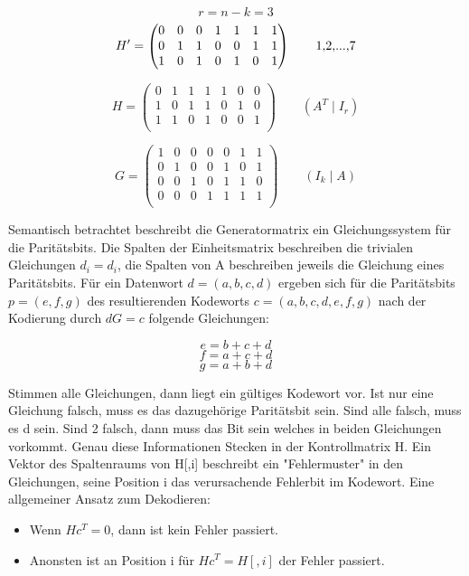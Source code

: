 $$r = n-k = 3$$
$$H' = \begin{pmatrix}
0 & 0 & 0 & 1 & 1 & 1 & 1 \\
0 & 1 & 1 & 0 & 0 & 1 & 1 \\
1 & 0 & 1 & 0 & 1 & 0 & 1 \\
\end{pmatrix}\text{\qquad{1,2,...,7}}$$

$$H = \begin{pmatrix}
0 & 1 & 1 & 1 & 1 & 0 & 0 \\
1 & 0 & 1 & 1 & 0 & 1 & 0 \\
1 & 1 & 0 & 1 & 0 & 0 & 1 \\
\end{pmatrix}\qquad{(A^T \mid I_r)}$$

$$G = \begin{pmatrix}
1 & 0 & 0 & 0 & 0 & 1 & 1 \\
0 & 1 & 0 & 0 & 1 & 0 & 1 \\
0 & 0 & 1 & 0 & 1 & 1 & 0 \\
0 & 0 & 0 & 1 & 1 & 1 & 1 \\
\end{pmatrix}\qquad{(I_k \mid A)}$$

Semantisch betrachtet beschreibt die Generatormatrix ein Gleichungssystem für die Paritätsbits. Die Spalten der Einheitsmatrix beschreiben die trivialen Gleichungen $d_i = d_i$, die Spalten von A beschreiben jeweils die Gleichung eines Paritätsbits. Für ein Datenwort $d=(a,b,c,d)$ ergeben sich für die Paritätsbits $p=(e,f,g)$ des resultierenden Kodeworts $c=(a,b,c,d,e,f,g)$ nach der Kodierung durch $dG = c$ folgende Gleichungen:

$$ e = b+c+d$$
$$ f = a+c+d$$
$$ g = a+b+d$$

Stimmen alle Gleichungen, dann liegt ein gültiges Kodewort vor. Ist nur eine Gleichung falsch, muss es das dazugehörige Paritätsbit sein. Sind alle falsch, muss es d sein. Sind 2 falsch, dann muss das Bit sein welches in beiden Gleichungen vorkommt. Genau diese Informationen Stecken in der Kontrollmatrix H. Ein Vektor des Spaltenraums von H[,i] beschreibt ein "Fehlermuster" in den Gleichungen, seine Position i das verursachende Fehlerbit im Kodewort. Eine allgemeiner Ansatz zum Dekodieren:

\begin{itemize}
\item Wenn $Hc^T = 0$, dann ist kein Fehler passiert.
\item Anonsten ist an Position i für $Hc^T = H[ ,i]$ der Fehler passiert.
\end{itemize}

